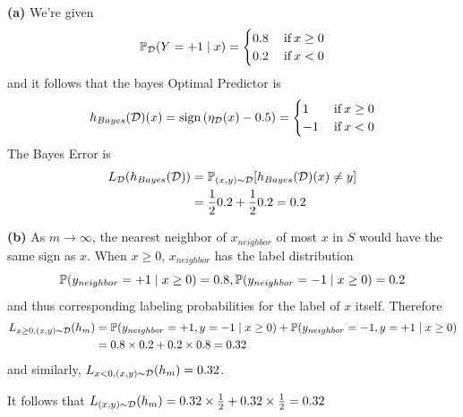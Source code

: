 \documentclass[a4paper, 12pt]{article}
\begin{document}
\begin{problem} [Problem 2]
\textbf{(a)} We're given \begin{equation*}
\mathbb{P}_{\mathcal{D}}(Y = +1 \mid x) = \begin{cases}
    0.8 & \:\text{if}\: x \geq 0 \\
    0.2 & \:\text{if}\: x < 0
\end{cases}
\end{equation*}
and it follows that the bayes Optimal Predictor is
\begin{equation*}
h_{Bayes}(\mathcal{D})(x) = \mathrm{sign}\left(\eta_{\mathcal{D}}(x) - 0.5\right) = \begin{cases}
1 & \:\text{if}\: x \geq 0 \\
-1 & \:\text{if}\: x < 0
\end{cases}
\end{equation*}
The Bayes Error is \begin{align*}
L_{\mathcal{D}} (h_{Bayes}(\mathcal{D})) &= \mathbb{P}_{(x, y) \sim \mathcal{D}}[h_{Bayes}(\mathcal{D})(x) \neq y] \\
&= \frac{1}{2} 0.2 + \frac{1}{2} 0.2 = 0.2
\end{align*}

\textbf{(b)} As $m \to \infty$, the nearest neighbor of $x_{neighbor}$ of most $x$ in $S$ would have the same sign as $x$. When $x \geq 0$, $x_{neighbor}$ has the label distribution \begin{equation*}
    \mathbb{P}(y_{neighbor} = +1 \mid x \geq 0) = 0.8, \mathbb{P}(y_{neighbor} = -1 \mid x \geq 0) = 0.2
\end{equation*}
and thus corresponding labeling probabilities for the label of $x$ itself. Therefore \begin{align*}
    L_{x \geq 0, (x, y) \sim \mathcal{D}} (h_m) &= \mathbb{P}(y_{neighbor} = +1, y = -1 \mid x \geq 0) + \mathbb{P}(y_{neighbor} = -1, y = +1 \mid x \geq 0) \\
    &= 0.8 \times 0.2 + 0.2 \times 0.8 = 0.32
\end{align*}
and similarly, $L_{x < 0, (x, y) \sim \mathcal{D}}(h_m) = 0.32$.

It follows that $L_{(x, y) \sim \mathcal{D}} (h_m) = 0.32 \times \frac{1}{2} + 0.32 \times \frac{1}{2} = 0.32$
\end{problem}
\end{document}
